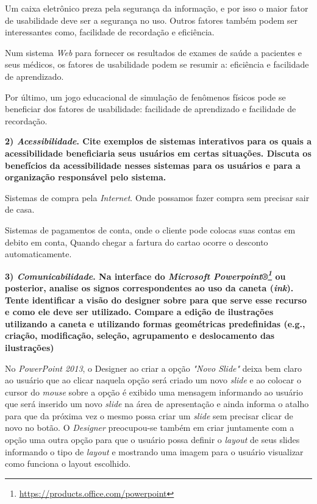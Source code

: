 \documentclass[
	article,			%
	11pt,				%
	oneside,			%
	a4paper,			%
	english,			%
	brazil,				%
	sumario=tradicional
	]{abntex2}
\begin{document}
Um caixa eletrônico preza pela segurança da informação, e por isso o maior fator de usabilidade deve ser a segurança no uso. Outros fatores também podem ser interessantes como, facilidade de recordação e eficiência.

Num sistema \textit{Web} para fornecer os resultados de exames de saúde a pacientes e seus médicos, os fatores de usabilidade podem se resumir a: eficiência e facilidade de aprendizado.

Por último, um jogo educacional de simulação de fenômenos físicos pode se beneficiar dos fatores de usabilidade: facilidade de aprendizado e facilidade de recordação.

\textbf{2) \textit{Acessibilidade}. Cite exemplos de sistemas interativos para os quais a acessibilidade beneficiaria seus usuários em certas situações. Discuta os benefícios da acessibilidade nesses sistemas para os usuários e para a organização responsável pelo sistema.}

Sistemas de compra pela \textit{Internet}. Onde possamos fazer compra sem precisar sair de casa.

Sistemas de pagamentos de conta, onde o cliente pode colocas suas contas em debito em conta, Quando chegar a fartura do cartao ocorre o desconto automaticamente.


\textbf{3) \textit{Comunicabilidade}. Na interface do \textit{Microsoft Powerpoint®\footnote{\href{https://products.office.com/powerpoint}{https://products.office.com/powerpoint}}} ou posterior, analise os signos correspondentes ao uso da caneta (\textit{ink}). Tente identificar a visão do designer sobre para que serve esse recurso e como ele deve ser utilizado. Compare a edição de ilustrações utilizando a caneta e utilizando formas geométricas predefinidas (e.g., criação, modificação, seleção, agrupamento e deslocamento das ilustrações)}

No \textit{PowerPoint 2013}, o Designer ao criar a opção \textit{"Novo Slide"} deixa bem claro ao usuário que ao clicar naquela opção será criado um novo \textit{slide} e ao colocar o cursor do \textit{mouse} sobre a opção é exibido uma mensagem informando ao usuário que será inserido um novo \textit{slide} na área de apresentação e ainda informa o atalho para que da próxima vez o mesmo possa criar um \textit{slide} sem precisar clicar de novo no botão. O \textit{Designer} preocupou-se também em criar juntamente com a opção uma outra opção para que o usuário possa definir o \textit{layout} de seus slides informando o tipo de \textit{layout} e mostrando uma imagem para o usuário visualizar como funciona o layout escolhido.
\end{document}
